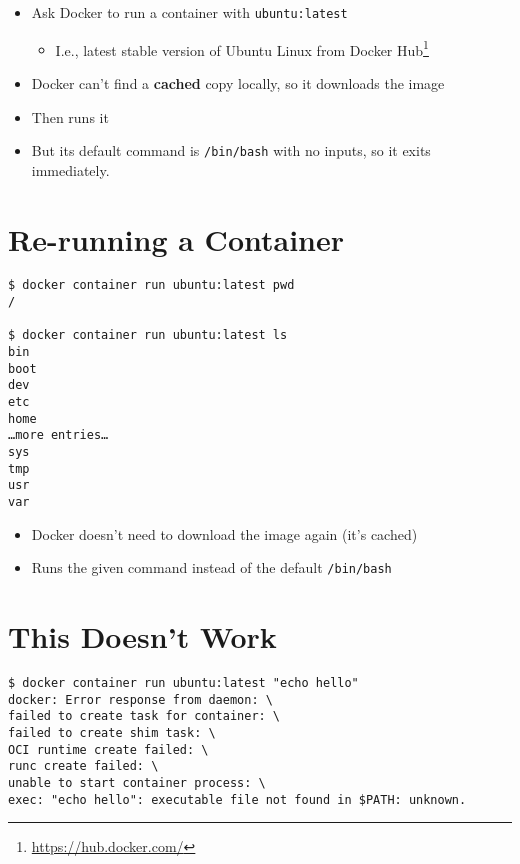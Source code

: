\documentclass[krantzl]{krantz}
\newcommand{\glossref}[1]{\textbf{#1}}
\newcommand{\hreffoot}[2]{{#1}\footnote{\href{#2}{#2}}}
\begin{document}
\begin{itemize}
\item Ask Docker to run a container with \texttt{ubuntu:latest}\begin{itemize}
\item I.e., latest stable version of Ubuntu Linux from \hreffoot{Docker Hub}{https://hub.docker.com/}

\end{itemize}


\item Docker can’t find a \glossref{cached} copy locally, so it downloads the image

\item Then runs it

\item But its default command is \texttt{/bin/bash} with no inputs, so it exits immediately.

\end{itemize}
\section{Re-running a Container}
\begin{lstlisting}[frame=tblr,backgroundcolor=\color{black!5}]
$ docker container run ubuntu:latest pwd
/

$ docker container run ubuntu:latest ls
bin
boot
dev
etc
home
…more entries…
sys
tmp
usr
var
\end{lstlisting}

\begin{itemize}
\item Docker doesn’t need to download the image again (it’s cached)

\item Runs the given command instead of the default \texttt{/bin/bash}

\end{itemize}
\section{This Doesn’t Work}
\begin{lstlisting}[frame=tblr,backgroundcolor=\color{black!5}]
$ docker container run ubuntu:latest "echo hello"
docker: Error response from daemon: \
failed to create task for container: \
failed to create shim task: \
OCI runtime create failed: \
runc create failed: \
unable to start container process: \
exec: "echo hello": executable file not found in $PATH: unknown.
\end{lstlisting}
\end{document}
